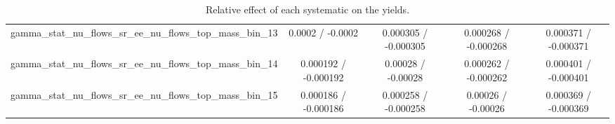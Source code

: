 \documentclass[10pt]{article}
\begin{document}
\begin{table}[htbp]
\begin{center}
\begin{tabular}{|c|c|c|c|c|}
  gamma_stat_nu_flows_sr_ee_nu_flows_top_mass_bin_13 & 0.0002 / -0.0002 & 0.000305 / -0.000305 & 0.000268 / -0.000268 & 0.000371 / -0.000371 \\ 
  gamma_stat_nu_flows_sr_ee_nu_flows_top_mass_bin_14 & 0.000192 / -0.000192 & 0.00028 / -0.00028 & 0.000262 / -0.000262 & 0.000401 / -0.000401 \\ 
  gamma_stat_nu_flows_sr_ee_nu_flows_top_mass_bin_15 & 0.000186 / -0.000186 & 0.000258 / -0.000258 & 0.00026 / -0.00026 & 0.000369 / -0.000369 \\ 
\hline 
\end{tabular} 
\caption{Relative effect of each systematic on the yields.} 
\end{center} 
\end{table} 
\end{document}
